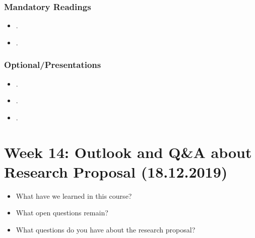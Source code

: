 \documentclass[abstract=on,parskip=full,headings=standardclasses,fontsize=11pt,paper=a4]{scrartcl}
\begin{document}
\subsubsection*{Mandatory Readings}
\begin{itemize}
\item {}.
\item {}.
\end{itemize}


\subsubsection*{Optional/Presentations}
\begin{itemize}
\item {}.
\item {}.
\item {}.
\end{itemize}



\section{Week 14: Outlook and Q\&A about Research Proposal (18.12.2019)}


\begin{itemize}
\renewcommand\labelitemi{--}
\item What have we learned in this course?
\item What open questions remain?
\item What questions do you have about the research proposal?
\end{itemize}


\sloppy
\renewcommand*{\bibfont}{\small}

\setlength{\bibitemsep}{0.2em} %
\printbibliography

\bigskip

\end{document}
